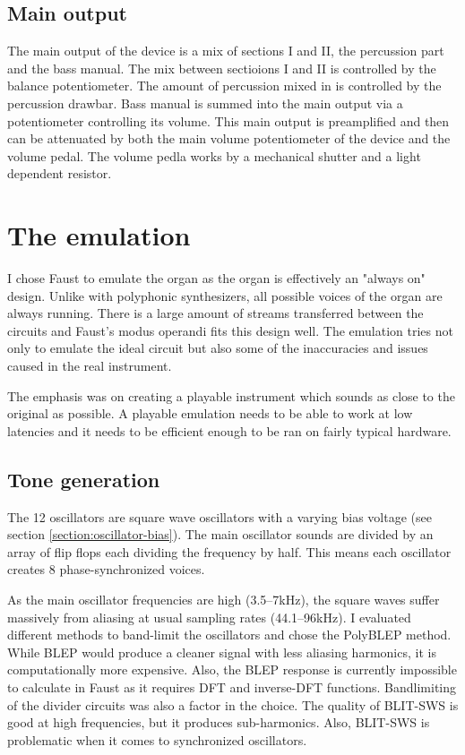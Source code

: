 \documentclass[11pt,a4paper]{article}
\begin{document}

\subsection{Main output}

The main output of the device is a mix of sections I and II, the percussion part and the bass manual. The mix between sectioions I and II is controlled by the balance potentiometer. The amount of percussion mixed in is controlled by the percussion drawbar. Bass manual is summed into the main output via a potentiometer controlling its volume. This main output is preamplified and then can be attenuated by both the main volume potentiometer of the device and the volume pedal. The volume pedla works by a mechanical shutter and a light dependent resistor.

\section{The emulation} 

I chose Faust to emulate the organ as the organ is effectively an "always on" design. Unlike with polyphonic synthesizers, all possible voices of the organ are always running. There is a large amount of streams transferred between the circuits and Faust's modus operandi fits this design well. The emulation tries not only to emulate the ideal circuit but also some of the inaccuracies and issues caused in the real instrument. 

The emphasis was on creating a playable instrument which sounds as close to the original as possible. A playable emulation needs to be able to work at low latencies and it needs to be efficient enough to be ran on fairly typical hardware.

\subsection{Tone generation}

The 12 oscillators are square wave oscillators with a varying bias voltage (see section \ref{section:oscillator-bias}). The main oscillator sounds are divided by an array of flip flops each dividing the frequency by half. This means each oscillator creates 8 phase-synchronized voices.

As the main oscillator frequencies are high (3.5--7kHz), the square waves suffer massively from aliasing at usual sampling rates (44.1--96kHz). I evaluated different methods to band-limit the oscillators and chose the PolyBLEP\cite{antialiasing} method. While BLEP\cite{hardsync} would produce a cleaner signal with less aliasing harmonics, it is computationally more expensive. Also, the BLEP response is currently impossible to calculate in Faust as it requires DFT and inverse-DFT functions. Bandlimiting of the divider circuits was also a factor in the choice. The quality of BLIT-SWS\cite{blit} is good at high frequencies, but it produces sub-harmonics\cite{antialiasing}. Also, BLIT-SWS is problematic when it comes to synchronized oscillators\cite{hardsync}.
\end{document}
